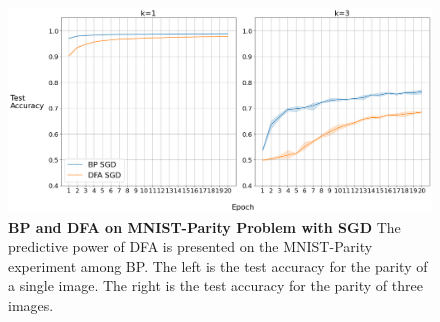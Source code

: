 \documentclass[a4paper, nobind]{templates/ociamthesis}
\begin{document}
\begin{figure}

{\centering \includegraphics[width=1\linewidth]{figures/3_k13_SGD_DFAvsBP} 

}

\caption[BP and DFA on MNIST-Parity Problem with SGD]{ \textbf{BP and DFA on MNIST-Parity Problem with SGD} \newline The predictive power of DFA is presented on the MNIST-Parity experiment among BP. The left is the test accuracy for the parity of a single image. The right is the test accuracy for the parity of three images.}\label{fig:BPvsDFA}
\end{figure}
\end{document}
